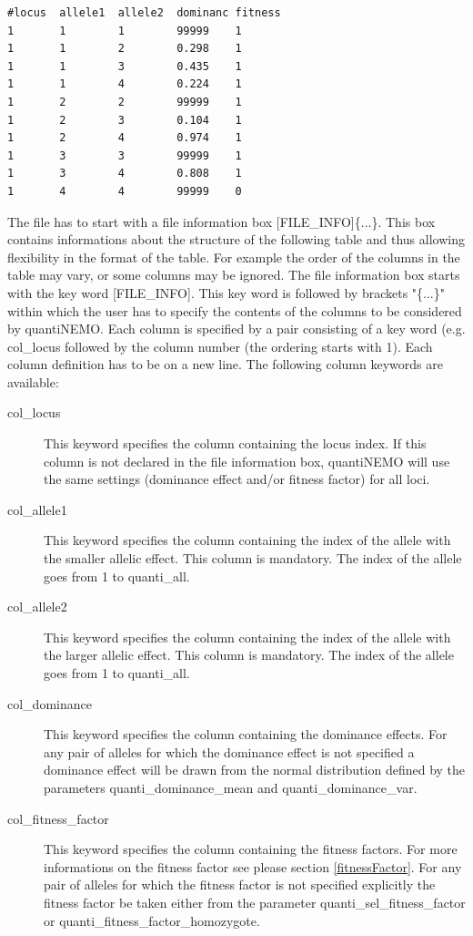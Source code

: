 \documentclass[letterpaper,12pt,oneside]{book}
\begin{document}
\begin{description}
\begin{lstlisting}[frame=single]
#locus  allele1  allele2  dominanc fitness
1       1        1        99999    1
1       1        2        0.298    1
1       1        3        0.435    1
1       1        4        0.224    1
1       2        2        99999    1
1       2        3        0.104    1
1       2        4        0.974    1
1       3        3        99999    1
1       3        4        0.808    1
1       4        4        99999    0
\end{lstlisting}

The file has to start with a file information box \textsf{[FILE\_INFO]}\{...\}. 
This box contains informations about the structure of the following table and thus allowing flexibility in the format of the table. For example the order of the columns in the table may vary, or some columns may be ignored. The file information box starts with the key word \textsf{[FILE\_INFO]}. This key word is followed by brackets "\{...\}" within which the user has to specify the contents of the columns to be considered by quantiNEMO. Each column is specified by a pair consisting of a key word (e.g. \textsf{col\_locus} followed by the column number (the ordering starts with 1). Each column definition has to be on a new line. The following column keywords are available:
\begin{description}
\item [col\_locus] This keyword specifies the column containing the locus index. If this column is not declared in the file information box, quantiNEMO will use the same settings (dominance effect and/or fitness factor) for all loci.
\item [col\_allele1] This keyword specifies the column containing the index of the allele with the smaller allelic effect. This column is mandatory. The index of the allele goes from 1 to \textsf{quanti\_all}.
\item [col\_allele2] This keyword specifies the column containing the index of the allele with the larger allelic effect. This column is mandatory. The index of the allele goes from 1 to \textsf{quanti\_all}.
\item [col\_dominance] This keyword specifies the column containing the dominance effects. For any pair of alleles for which the dominance effect is not specified a dominance effect will be drawn from the normal distribution defined by the parameters  \textsf{quanti\_dominance\_mean} and \textsf{quanti\_dominance\_var}.
\item [col\_fitness\_factor] This keyword specifies the column containing the fitness factors. For more informations on the fitness factor see please section \ref{fitnessFactor}. For any pair of alleles for which the fitness factor is not specified explicitly the fitness factor be taken either from the parameter \textsf{quanti\_sel\_fitness\_factor} or \textsf{quanti\_fitness\_factor\_homozygote}.

\end{description}
\end{description}
\end{document}
